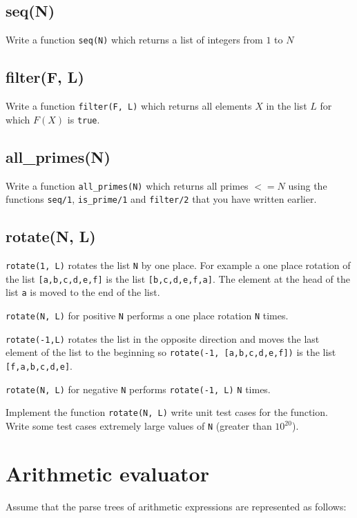 \documentclass[12pt]{hitec}
\begin{document}
\subsection{seq(N)}
Write a function \verb+seq(N)+ which returns a list of integers from
$1$ to $N$

\subsection{filter(F, L)}

Write a function \verb+filter(F, L)+ which returns all elements $X$ in
the list $L$ for which $F(X)$ is \verb+true+.

\subsection {all\_primes(N)}

Write a function \verb+all_primes(N)+ which returns
all primes $<= N$ using the functions \verb+seq/1+,
\verb+is_prime/1+ and \verb+filter/2+ that you have written earlier.


\subsection{rotate(N, L)}

\verb+rotate(1, L)+ rotates the list \verb+N+ by one place.
For example a one place rotation of the list \verb+[a,b,c,d,e,f]+ is the list
\verb+[b,c,d,e,f,a]+. The element at the head of the list \verb+a+ is moved
to the end of the list.

\verb+rotate(N, L)+ for positive \verb+N+ performs a one place rotation \verb+N+ times.

\verb+rotate(-1,L)+ rotates the list in the opposite direction and moves the
last element of the list to the beginning 
so  \verb+rotate(-1, [a,b,c,d,e,f])+ is the list
\verb+[f,a,b,c,d,e]+.

\verb+rotate(N, L)+ for negative \verb+N+ performs \verb+rotate(-1, L)+ \verb+N+ times.

Implement the function \verb+rotate(N, L)+ write unit test cases for the
function. Write some test cases extremely large values
of \verb+N+ (greater than $10^{20}$).

\section{Arithmetic evaluator}

Assume that the parse trees of
arithmetic expressions are represented as follows:
\end{document}
